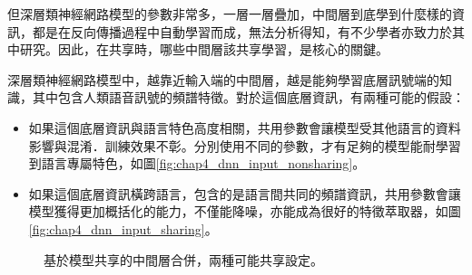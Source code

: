 但深層類神經網路模型的參數非常多，一層一層疊加，中間層到底學到什麼樣的資訊，都是在反向傳播過程中自動學習而成，無法分析得知，有不少學者亦致力於其中研究\cite{nagamine2015exploring}。因此，在共享時，哪些中間層該共享學習，是核心的關鍵。

深層類神經網路模型中，越靠近輸入端的中間層，越是能夠學習底層訊號端的知識，其中包含人類語音訊號的頻譜特徵。對於這個底層資訊，有兩種可能的假設：
\begin{itemize}
 \itemsep -2pt
 \item 如果這個底層資訊與語言特色高度相關，共用參數會讓模型受其他語言的資料影響與混淆．訓練效果不彰。分別使用不同的參數，才有足夠的模型能耐學習到語言專屬特色，如圖\ref{fig:chap4_dnn_input_nonsharing}。
 \item 如果這個底層資訊橫跨語言，包含的是語言間共同的頻譜資訊，共用參數會讓模型獲得更加概括化的能力，不僅能降噪，亦能成為很好的特徵萃取器，如圖\ref{fig:chap4_dnn_input_sharing}。
\end{itemize}

\begin{figure}[!h]
\centering
{}
\caption{基於模型共享的中間層合併，兩種可能共享設定。}
\end{figure}

